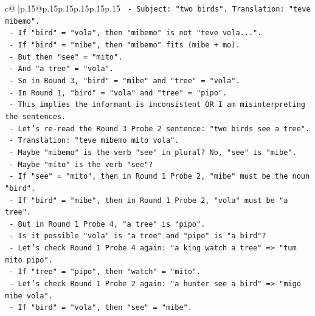 \documentclass{article}
\begin{document}
{\begin{supertabular}{c@{$\;$}|p{.15\linewidth}@{}p{.15\linewidth}p{.15\linewidth}p{.15\linewidth}p{.15\linewidth}p{.15\linewidth}}
{{{\texttt{                    {-} Subject: "two birds". Translation: "teve mibemo".} \\
\texttt{                    {-} If "bird" = "vola", then "mibemo" is not "teve vola...".} \\
\texttt{                    {-} If "bird" = "mibe", then "mibemo" fits (mibe + mo).} \\
\texttt{                    {-} But then "see" = "mito".} \\
\texttt{                    {-} And "a tree" = "vola".} \\
\texttt{                    {-} So in Round 3, "bird" = "mibe" and "tree" = "vola".} \\
\texttt{                    {-} In Round 1, "bird" = "vola" and "tree" = "pipo".} \\
\texttt{                    {-} This implies the informant is inconsistent OR I am misinterpreting the sentences.} \\
\texttt{                    {-} Let's re{-}read the Round 3 Probe 2 sentence: "two birds see a tree".} \\
\texttt{                    {-} Translation: "teve mibemo mito vola".} \\
\texttt{                    {-} Maybe "mibemo" is the verb "see" in plural? No, "see" is "mibe".} \\
\texttt{                    {-} Maybe "mito" is the verb "see"?} \\
\texttt{                    {-} If "see" = "mito", then in Round 1 Probe 2, "mibe" must be the noun "bird".} \\
\texttt{                    {-} If "bird" = "mibe", then in Round 1 Probe 2, "vola" must be "a tree".} \\
\texttt{                    {-} But in Round 1 Probe 4, "a tree" is "pipo".} \\
\texttt{                    {-} Is it possible "vola" is "a tree" and "pipo" is "a bird"?} \\
\texttt{                    {-} Let's check Round 1 Probe 4 again: "a king watch a tree" => "tum mito pipo".} \\
\texttt{                      {-} If "tree" = "pipo", then "watch" = "mito".} \\
\texttt{                    {-} Let's check Round 1 Probe 2 again: "a hunter see a bird" => "migo mibe vola".} \\
\texttt{                      {-} If "bird" = "vola", then "see" = "mibe".} \\
}}}
\end{supertabular}}
\end{document}
